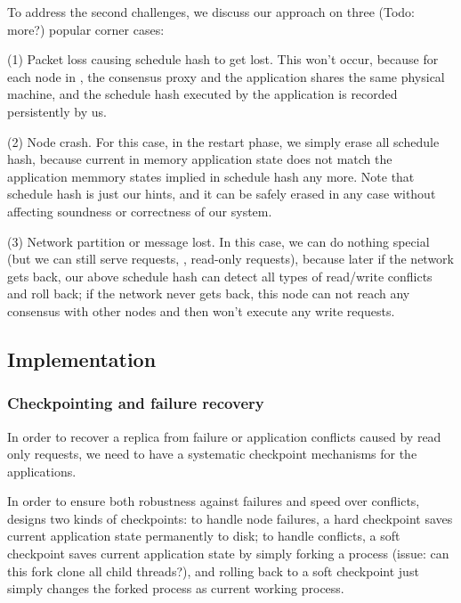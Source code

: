 To address the second challenges, we discuss our approach on three (Todo: more?) popular 
corner cases:

(1) Packet loss causing schedule hash to get lost. This won't occur, because 
for each node in \msmr, the consensus proxy and the application shares the same 
physical machine, and the schedule hash executed by the application is recorded 
persistently by us.

(2) Node crash. For this case, in the restart phase, we simply erase all 
schedule hash, because current in memory application state does not match the 
application memmory states implied in schedule hash any more. Note that 
schedule hash is just our hints, and it can be safely erased in any case 
without affecting soundness or correctness of our system.

(3) Network partition or \paxos message lost. In this case, we can do nothing 
special (but we can still serve requests, \eg, read-only requests), because 
later if the network gets back, our above schedule hash can detect all types of 
read/write conflicts and roll back; if the network never gets back, this node 
can not reach any consensus with other nodes and then won't execute any write 
requests.



\subsection{Implementation} \label{sec:rep-impl}

\subsubsection{Checkpointing and failure recovery} \label{sec:rep-checkpoint}
In order to recover a replica from failure or application conflicts caused by 
read only requests, we need to have a systematic checkpoint mechanisms for the applications.

In order to ensure both robustness against failures and speed over conflicts, 
\msmr designs two kinds of checkpoints: to handle node failures, a hard checkpoint saves current application 
state permanently to 
disk; to handle conflicts, a soft checkpoint saves current application state by 
simply forking a process (issue: can this fork clone all child threads?), and 
rolling back to a soft checkpoint just simply changes the forked process as 
current working process.

